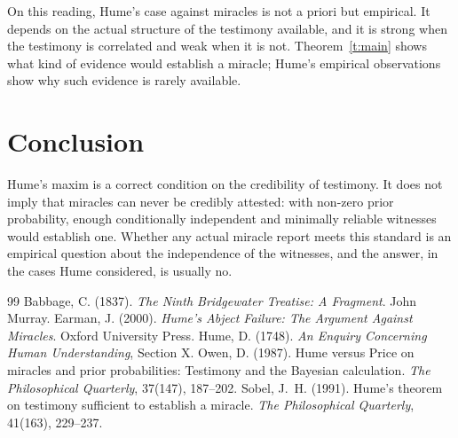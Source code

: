 \documentclass{situationist-preprint}
\begin{document}
On this reading, Hume's case against miracles is not a priori but empirical. It depends on the actual structure of the testimony available, and it is strong when the testimony is correlated and weak when it is not. Theorem~\ref{t:main} shows what kind of evidence would establish a miracle; Hume's empirical observations show why such evidence is rarely available.

\section{Conclusion}

Hume's maxim is a correct condition on the credibility of testimony. It does not imply that miracles can never be credibly attested: with non-zero prior probability, enough conditionally independent and minimally reliable witnesses would establish one. Whether any actual miracle report meets this standard is an empirical question about the independence of the witnesses, and the answer, in the cases Hume considered, is usually no.

\begin{thebibliography}{99}\small
{} Babbage, C. (1837). \emph{The Ninth Bridgewater Treatise: A Fragment}. John Murray.
 Earman, J. (2000). \emph{Hume's Abject Failure: The Argument Against Miracles}. Oxford University Press.
 Hume, D. (1748). \emph{An Enquiry Concerning Human Understanding}, Section X.
 Owen, D. (1987). Hume versus Price on miracles and prior probabilities: Testimony and the Bayesian calculation. \emph{The Philosophical Quarterly}, 37(147), 187--202.
 Sobel, J.~H. (1991). Hume's theorem on testimony sufficient to establish a miracle. \emph{The Philosophical Quarterly}, 41(163), 229--237.
\end{thebibliography}
\end{document}
